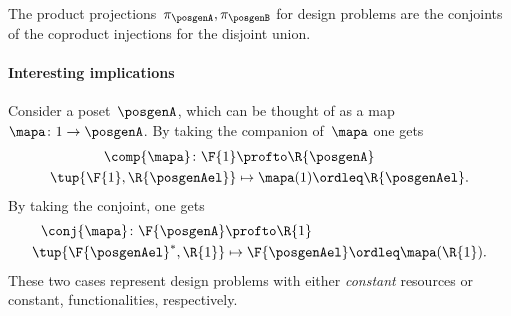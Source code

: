 \begin{example}
    The product projections~$\pi_\posgenA, \pi_\posgenB$ for design problems are the conjoints of the coproduct injections for the disjoint union.
\end{example}

\paragraph{Interesting implications}
Consider a poset~$\posgenA$, which can be thought of as a map~$\mapa \colon 1\to \posgenA$.
By taking the companion of~$\mapa$ one gets
\begin{equation}
    \begin{aligned}
        \comp{\mapa}\colon \F{1}   & \profto \R{\posgenA}                    \\
        \tup{\F{1},\R{\posgenAel}} & \mapsto \mapa(1)\ordleq \R{\posgenAel}.
    \end{aligned}
\end{equation}
By taking the conjoint, one gets
\begin{equation}
    \begin{aligned}
        \conj{\mapa}\colon \F{\posgenA} & \profto \R{1}                               \\
        \tup{\F{\posgenAel}^*,\R{1}}    & \mapsto \F{\posgenAel}\ordleq \mapa(\R{1}).
    \end{aligned}
\end{equation}
These two cases represent design problems with either \emph{constant} resources or constant, functionalities, respectively.